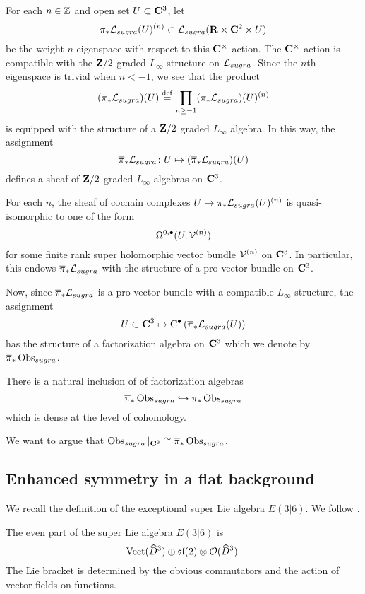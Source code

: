 \documentclass[11pt]{amsart}
\begin{document}
For each $n \in \mathbb Z$ and open set $U \subset \mathbf{C}^3$, let 
\[
\pi_* \mathcal L_{sugra}(U)^{(n)} \subset \mathcal L_{sugra}(\mathbf{R} \times \mathbf{C}^2 \times U)
\]
be the weight $n$ eigenspace with respect to this $\mathbf{C}^\times$ action. 
The $\mathbf{C}^\times$ action is compatible with the $\mathbf{Z}/2$ graded $L_\infty$ structure on $\mathcal L_{sugra}$. 
Since the $n$th eigenspace is trivial when $n < -1$, we see that the product
\[
(\overline{\pi}_* \mathcal L_{sugra})(U) \overset{\rm def}{=} \prod_{n \geq -1} (\pi_*\mathcal L_{sugra})(U)^{(n)}
\]
is equipped with the structure of a $\mathbf{Z}/2$ graded $L_\infty$ algebra.
In this way, the assignment 
\[
\overline{\pi}_* \mathcal L_{sugra} \colon U \mapsto (\overline{\pi}_* \mathcal L_{sugra})(U) 
\]
defines a sheaf of $\mathbf{Z}/2$ graded $L_\infty$ algebras on $\mathbf{C}^3$. 

\begin{prop}
For each $n$, the sheaf of cochain complexes $U \mapsto \pi_* \mathcal L_{sugra}(U)^{(n)}$ is quasi-isomorphic to one of the form
\[
\Omega^{0,\bullet}(U, \mathcal V^{(n)})
\]
for some finite rank super holomorphic vector bundle $\mathcal V^{(n)}$ on $\mathbf{C}^3$. 
In particular, this endows $\overline{\pi}_* \mathcal L_{sugra}$ with the structure of a pro-vector bundle on $\mathbf{C}^3$. 
\end{prop}

Now, since $\overline{\pi}_* \mathcal L_{sugra}$ is a pro-vector bundle with a compatible $L_\infty$ structure, the assignment 
\[
U\subset \mathbf{C}^3 \mapsto {\rm C}^\bullet\left(\overline{\pi}_* \mathcal L_{sugra}(U)\right) 
\]
has the structure of a factorization algebra on $\mathbf{C}^3$ which we denote by $\overline{\pi}_* \operatorname{Obs}_{sugra}$. 

\begin{prop}
There is a natural inclusion of of factorization algebras 
\[
\overline{\pi}_* \operatorname{Obs}_{sugra} \hookrightarrow \pi_* \operatorname{Obs}_{sugra}
\]
which is dense at the level of cohomology. 
\end{prop} 

We want to argue that $\operatorname{Obs}_{sugra} |_{\mathbf{C}^3} \cong \overline{\pi}_* \operatorname{Obs}_{sugra}$. 


\subsection{Enhanced symmetry in a flat background}

\parsec[s:e36]

We recall the definition of the exceptional super Lie algebra $E(3|6)$. 
We follow \cite{Kac_class, KacRudakov}.

The even part of the super Lie algebra $E(3|6)$ is 
\[
\operatorname{Vect}(\widehat{D}^3) \oplus \mathfrak{sl}(2) \otimes \mathcal O(\widehat{D}^3) .
\]
The Lie bracket is determined by the obvious commutators and the action of vector fields on functions. 
\end{document}
